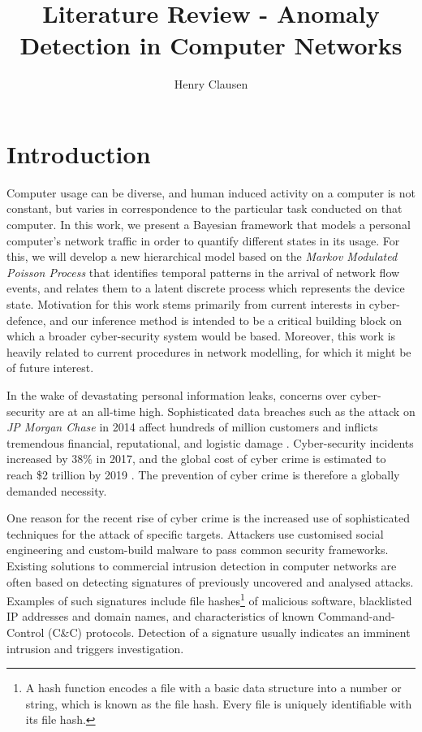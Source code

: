 \documentclass[a4paper,12pt,twoside]{report}
\begin{document}
\title{\LARGE {\bf Literature Review - Anomaly Detection in Computer Networks}\\
 \vspace*{6mm}
}

\author{Henry Clausen}

\maketitle



\chapter{Introduction}

Computer usage can be diverse, and human induced activity on a computer is not constant, but varies in correspondence to the particular task conducted on that computer. In this work, we present a Bayesian framework that models a personal computer's network traffic in order to quantify different states in its usage. For this, we will develop a new hierarchical model based on the \emph{Markov Modulated Poisson Process} that identifies temporal patterns in the arrival of network flow events, and relates them to a latent discrete process which represents the device state. Motivation for this work stems primarily from current interests in cyber-defence, and our inference method is intended to be a critical building block on which a broader cyber-security system would be based. Moreover, this work is heavily related to current procedures in network modelling, for which it might be of future interest.


In the wake of devastating personal information leaks, concerns over cyber-security are at an all-time high. 
Sophisticated data breaches such as the attack on \emph{JP Morgan Chase} in 2014  affect hundreds of million customers and inflicts tremendous financial, reputational, and logistic damage %
. Cyber-security incidents increased by 38\% in 2017, and the global cost of cyber crime is estimated to reach \$2 trillion by 2019 %
. The prevention of cyber crime is therefore a globally demanded necessity.

One reason for the recent rise of cyber crime is the increased use of sophisticated techniques for the attack of specific targets. Attackers use customised social engineering and custom-build malware to pass common security frameworks.
Existing solutions to commercial intrusion detection in computer networks are often based on detecting signatures of previously uncovered  and  analysed  attacks. Examples of such signatures include  file  hashes\footnote{A hash function encodes a file with a basic data structure into a number or string, which is known as the file hash. Every file is uniquely identifiable with its file hash.} of malicious software, blacklisted IP addresses and domain names, and characteristics of known Command-and-Control (C\&C) protocols. Detection of a signature usually indicates an imminent intrusion and triggers investigation.
\end{document}
